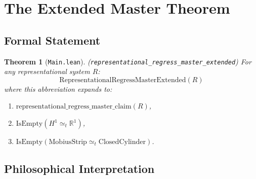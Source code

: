\documentclass[11pt]{article}
\newtheorem{theorem}{Theorem}[section]
\newcommand{\leanref}[1]{\texttt{\small #1}}
\begin{document}
\section{The Extended Master Theorem}
\label{sec:extended}


\subsection{Formal Statement}

\begin{theorem}[\leanref{Main.lean}]
\label{thm:extended}
(\leanref{representational\_regress\_master\_extended})
For any representational system $R$:
\[
  \mathrm{RepresentationalRegressMasterExtended}(R)
\]
where this abbreviation expands to:
\begin{enumerate}[label=(\roman*)]
\item $\mathrm{representational\_regress\_master\_claim}(R)$,
\item $\mathrm{IsEmpty}(H^1 \simeq_t \mathbb{R}^1)$,
\item $\mathrm{IsEmpty}(\mathrm{MobiusStrip} \simeq_t \mathrm{ClosedCylinder})$.
\end{enumerate}
\end{theorem}


\subsection{Philosophical Interpretation}

%
%
%
\end{document}
